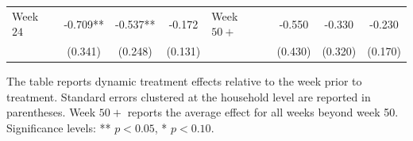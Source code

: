 \begin{table}[htbp]
\begin{threeparttable}
\begin{tabular}{lccc lccc}
Week $24$ & -0.709** & -0.537** & -0.172 & Week $50+$ & -0.550 & -0.330 & -0.230 \\
          & (0.341)  & (0.248)  & (0.131) &            & (0.430) & (0.320) & (0.170) \\

\bottomrule
\end{tabular}
\begin{tablenotes}[flushleft]
\footnotesize
\item The table reports dynamic treatment effects relative to the week prior to treatment. Standard errors clustered at the household level are reported in parentheses. Week $50+$ reports the average effect for all weeks beyond week 50. Significance levels: ** $p<0.05$, * $p<0.10$.
\end{tablenotes}
\end{threeparttable}
\end{table}



